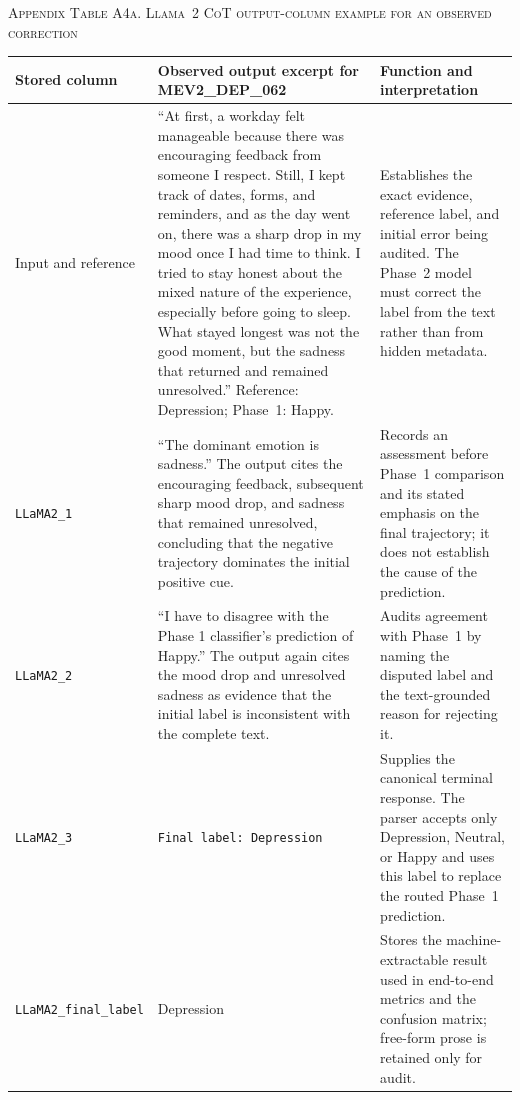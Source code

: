 \documentclass{ieeeaccess}
\begin{document}
\par\medskip
{}
\noindent\textsc{Appendix Table A4a. Llama~2 CoT output-column example for an observed correction}\par
\label{tab:appendix-a4-llama2-output-columns}
\smallskip
\footnotesize
\setlength{\tabcolsep}{3.5pt}
\renewcommand{\arraystretch}{1.16}
\noindent\begin{tabularx}{\textwidth}{@{}>{\raggedright\arraybackslash}p{}>{\raggedright\arraybackslash}p{}Y@{}}
\toprule
Stored column & Observed output excerpt for MEV2\_DEP\_062 & Function and interpretation \\
\midrule
Input and reference & ``At first, a workday felt manageable because there was encouraging feedback from someone I respect. Still, I kept track of dates, forms, and reminders, and as the day went on, there was a sharp drop in my mood once I had time to think. I tried to stay honest about the mixed nature of the experience, especially before going to sleep. What stayed longest was not the good moment, but the sadness that returned and remained unresolved.'' Reference: Depression; Phase~1: Happy. & Establishes the exact evidence, reference label, and initial error being audited. The Phase~2 model must correct the label from the text rather than from hidden metadata. \\
\texttt{LLaMA2\_1} & ``The dominant emotion is sadness.'' The output cites the encouraging feedback, subsequent sharp mood drop, and sadness that remained unresolved, concluding that the negative trajectory dominates the initial positive cue. & Records an assessment before Phase~1 comparison and its stated emphasis on the final trajectory; it does not establish the cause of the prediction. \\
\texttt{LLaMA2\_2} & ``I have to disagree with the Phase 1 classifier's prediction of Happy.'' The output again cites the mood drop and unresolved sadness as evidence that the initial label is inconsistent with the complete text. & Audits agreement with Phase~1 by naming the disputed label and the text-grounded reason for rejecting it. \\
\texttt{LLaMA2\_3} & \texttt{Final label: Depression} & Supplies the canonical terminal response. The parser accepts only Depression, Neutral, or Happy and uses this label to replace the routed Phase~1 prediction. \\
\texttt{LLaMA2\_final\_label} & Depression & Stores the machine-extractable result used in end-to-end metrics and the confusion matrix; free-form prose is retained only for audit. \\
\bottomrule
\end{tabularx}
\par\medskip
\normalsize
\end{document}

